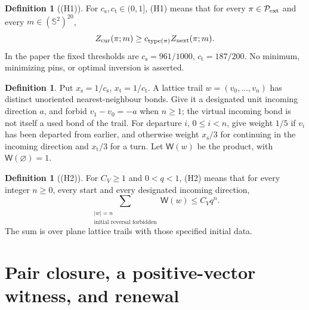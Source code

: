 \documentclass[11pt,reqno]{amsart}
\theoremstyle{definition}
\newtheorem{definition}[theorem]{Definition}
\theoremstyle{remark}
\begin{document}
\begin{definition}[(H1)]\label{h:H1}
For \(c_{\mathrm s},c_{\mathrm t}\in(0,1]\), (H1) means that
for every \(\pi\in\mathcal P_{\rm ext}\) and every
\(m\in(\mathbb S^2)^{20}\),
\[
 Z_{\rm cur}(\pi;m)\ge c_{\rm type(\pi)}Z_{\rm next}(\pi;m).
\]
In the paper the fixed thresholds are
\(c_{\mathrm s}=961/1000\), \(c_{\mathrm t}=187/200\).
No minimum, minimizing pins, or optimal inversion is asserted.
\end{definition}

\begin{definition}\label{d:weights}
Put \(x_{\mathrm s}=1/c_{\mathrm s}\), \(x_{\mathrm t}=1/c_{\mathrm t}\).
A lattice trail \(w=(v_0,\ldots,v_n)\) has distinct unoriented
nearest-neighbour bonds. Give it a designated unit incoming direction
\(a\), and forbid \(v_1-v_0=-a\) when \(n\ge1\); the virtual
incoming bond is not itself a used bond of the trail.
For departure \(i\), \(0\le i<n\), give weight \(1/5\) if \(v_i\)
has been departed from earlier, and otherwise weight \(x_{\mathrm s}/3\)
for continuing in the incoming direction and \(x_{\mathrm t}/3\)
for a turn. Let \(\mathsf W(w)\) be the product, with
\(\mathsf W(\varnothing)=1\).
\end{definition}

\begin{definition}[(H2)]\label{h:H2}
For \(C_V\ge1\) and \(0<q<1\), (H2) means that for every
integer \(n\ge0\), every start and every designated incoming direction,
\[
 \sum_{\substack{|w|=n\\\text{initial reversal forbidden}}}
                      \mathsf W(w)\le C_Vq^n .
\]
The sum is over plane lattice trails with those specified initial data.
\end{definition}


\section{Pair closure, a positive-vector witness, and renewal}
\end{document}
